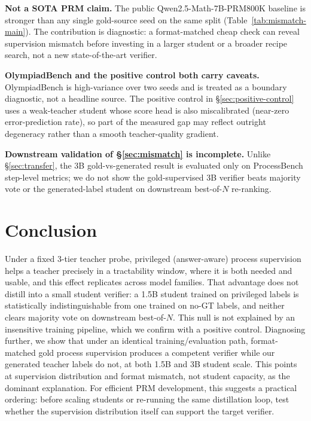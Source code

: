 \documentclass{article}
\begin{document}
\textbf{Not a SOTA PRM claim.} The public Qwen2.5-Math-7B-PRM800K baseline
is stronger than any single gold-source seed on the same split
(Table~\ref{tab:mismatch-main}). The contribution is diagnostic: a
format-matched cheap check can reveal supervision mismatch before investing
in a larger student or a broader recipe search, not a new state-of-the-art
verifier.

\textbf{OlympiadBench and the positive control both carry caveats.}
OlympiadBench is high-variance over two seeds and is treated as a boundary
diagnostic, not a headline source. The positive control in
\S\ref{sec:positive-control} uses a weak-teacher student whose score head is
also miscalibrated (near-zero error-prediction rate), so part of the
measured gap may reflect outright degeneracy rather than a smooth
teacher-quality gradient.

\textbf{Downstream validation of \S\ref{sec:mismatch} is incomplete.} Unlike
\S\ref{sec:transfer}, the 3B gold-vs-generated result is evaluated only on
ProcessBench step-level metrics; we do not show the gold-supervised 3B
verifier beats majority vote or the generated-label student on downstream
best-of-$N$ re-ranking.

\section{Conclusion}
\label{sec:conclusion}

Under a fixed 3-tier teacher probe, privileged (answer-aware) process
supervision helps a teacher precisely in a tractability window, where it
is both needed and usable, and this effect replicates across model families.
That advantage does not distill into a small student verifier: a 1.5B
student trained on privileged labels is statistically indistinguishable from
one trained on no-GT labels, and neither clears majority vote on downstream
best-of-$N$. This null is not explained by an insensitive training pipeline,
which we confirm with a positive control. Diagnosing further, we show that
under an identical training/evaluation path, format-matched gold process
supervision produces a competent verifier while our generated teacher labels
do not, at both 1.5B and 3B student scale. This points at supervision
distribution and format mismatch, not student capacity, as the dominant
explanation. For efficient PRM development, this suggests a practical
ordering: before scaling students or re-running the same distillation loop,
test whether the supervision distribution itself can support the target
verifier.
\end{document}
